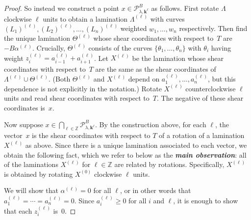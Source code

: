 \documentclass{amsart}
\theoremstyle{definition}
\theoremstyle{remark}
\numberwithin{equation}{section}
\newcommand{\newword}[1]{\textbf{\emph{#1}}}
\newcommand{\integers}{\mathbb Z}
\newcommand{\set}[1]{{\lbrace #1 \rbrace}}
\newcommand{\0}{{\mathbf{0}}}
\newcommand{\kk}{{\boldsymbol{k}}}
\renewcommand{\P}{\mathcal{P}}
\begin{document}
\begin{proof}
So instead we construct a point $x\in \P^B_{\lambda,\kk^\ell}$ as follows.
First rotate $\Lambda$ clockwise $\ell$ units to obtain a lamination $\Lambda^{(\ell)}$
with curves $(L_1)^{(\ell)},(L_2)^{(\ell)},\ldots,(L_n)^{(\ell)}$ weighted $w_1,\ldots,w_n$ respectively.
Then find the unique lamination $\Theta^{(\ell)}$ whose shear coordinates with respect to~$T$ are~$-B\alpha^{(\ell)}$.
Crucially, $\Theta^{(\ell)}$ consists of the curves $\set{\theta_1,\ldots,\theta_n}$ with $\theta_i$ having weight $z_i^{(\ell)}=a_{i-1}^{(\ell)}+a_{i+1}^{(\ell)}$. 
Let $X^{(\ell)}$ be the lamination whose shear coordinates with respect to~$T$ are the same as the shear coordinates of $\Lambda^{(\ell)}\cup\Theta^{(\ell)}$.
(Both $\Theta^{(\ell)}$ and $X^{(\ell)}$ depend on $a_1^{(\ell)},\ldots,a_n^{(\ell)}$, but this dependence is not explicitly in the notation.)
Rotate $X^{(\ell)}$ counterclockwise $\ell$ units and read shear coordinates with respect to~$T$.
The negative of these shear coordinates is~$x$.

Now suppose $x\in\bigcap_{\ell\in\integers}\P^B_{\lambda,\kk^\ell}$.
By the construction above, for each $\ell$, the vector~$x$ is the shear coordinates with respect to $T$ of a rotation of a lamination $X^{(\ell)}$ as above.
Since there is a unique lamination associated to each vector, we obtain the following fact, which we refer to below as the \newword{main observation}:  all of the laminations $X^{(\ell)}$ for $\ell\in\integers$ are related by rotations.
Specifically, $X^{(\ell)}$ is obtained by rotating $X^{(0)}$ clockwise $\ell$ units.

We will show that $\alpha^{(\ell)}=0$ for all $\ell$, or in other words that $a_1^{(\ell)}=\cdots=a_n^{(\ell)}=0$.
Since $a_i^{(\ell)}\ge 0$ for all $i$ and $\ell$, it is enough to show that each $z_i^{(\ell)}$ is~$0$.


\end{proof}
\end{document}
